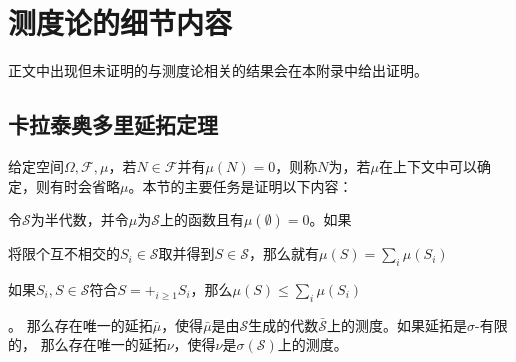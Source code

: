 \documentclass[main.tex]{subfiles}
\begin{document}
\appendix
\chapter{测度论的细节内容}
正文中出现但未证明的与测度论相关的结果会在本附录中给出证明。
\section{卡拉泰奥多里延拓定理} \label{sec:a.1}
给定空间\(\Omega, \mathcal{F}, \mu\)，若\(N \in \mathcal{F}\)并有\(\mu(N) = 0\)，则称\(N\)为，若\(\mu\)在上下文中可以确定，则有时会省略\(\mu\)。本节的主要任务是证明以下内容：
\begin{theorem} \label{thm:a.1.1}
	令\(\mathcal{S}\)为半代数，并令\(\mu\)为\(\mathcal{S}\)上的函数且有\(\mu(\emptyset) = 0\)。如果
	\begin{enumerate*}
		\item \label{thm:a.1.1.1} 将限个互不相交的\(S_i \in \mathcal{S}\)取并得到\(S \in \mathcal{S}\)，那么就有\(\mu(S) = \sum_{i}\mu(S_i)\)
		\item \label{thm:a.1.1.2} 如果\(S_i, S \in \mathcal{S}\)符合\(S = +_{i \geq 1}S_i\)，那么\(\mu(S) \leq \sum_{i}\mu(S_i)\)
	\end{enumerate*}。
	那么存在唯一的延拓\(\bar{\mu}\)，使得\(\bar{\mu}\)是由\(\mathcal{S}\)生成的代数\(\bar{\mathcal{S}}\)上的测度。如果延拓是\(\sigma\)-有限的，
	那么存在唯一的延拓\(\nu\)，使得\(\nu\)是\(\sigma(\mathcal{S})\)上的测度。
\end{theorem}
\end{document}
